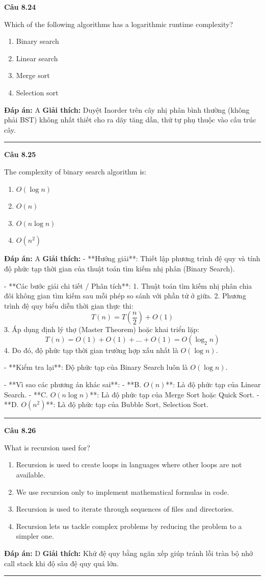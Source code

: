 \documentclass[11pt,a4paper]{article}
\newenvironment{question}[1]{%
  \par\vspace{1em}\noindent\textbf{\large Câu #1}\par\vspace{0.4em}
}{%
  \par\vspace{1em}\hrule\vspace{0.6em}
}
\newenvironment{choices}{%
  \begin{enumerate}[label=\textbf{\Alph*.},leftmargin=2.2em,itemsep=2pt,topsep=3pt]
}{%
  \end{enumerate}
}
\newcommand{\choice}{\item}
\begin{document}
\begin{question}{8.24}
Which of the following algorithms has a logarithmic runtime complexity?
\begin{choices}
\choice Binary search
\choice Linear search
\choice Merge sort
\choice Selection sort
\end{choices}
\textbf{Đáp án:} A
\textbf{Giải thích:} Duyệt Inorder trên cây nhị phân bình thường (không phải BST) không nhất thiết cho ra dãy tăng dần, thứ tự phụ thuộc vào cấu trúc cây.
\end{question}

\begin{question}{8.25}
The complexity of binary search algorithm is:
\begin{choices}
\choice \(O(\log n)\)
\choice \(O(n)\)
\choice \(O(n \log n)\)
\choice \(O(n^2)\)
\end{choices}
\textbf{Đáp án:} A
\textbf{Giải thích:} - **Hướng giải**:
  Thiết lập phương trình đệ quy và tính độ phức tạp thời gian của thuật toán tìm kiếm nhị phân (Binary Search).

- **Các bước giải chi tiết / Phân tích**:
  1. Thuật toán tìm kiếm nhị phân chia đôi không gian tìm kiếm sau mỗi phép so sánh với phần tử ở giữa.
  2. Phương trình đệ quy biểu diễn thời gian thực thi:
     \[
     T(n) = T\left(\frac{n}{2}\right) + O(1)
     \]
  3. Áp dụng định lý thợ (Master Theorem) hoặc khai triển lặp:
     \[
     T(n) = O(1) + O(1) + \dots + O(1) = O(\log_2 n)
     \]
  4. Do đó, độ phức tạp thời gian trường hợp xấu nhất là \(O(\log n)\).

- **Kiểm tra lại**:
  Độ phức tạp của Binary Search luôn là \(O(\log n)\).

- **Vì sao các phương án khác sai**:
  - **B. \(O(n)\)**: Là độ phức tạp của Linear Search.
  - **C. \(O(n \log n)\)**: Là độ phức tạp của Merge Sort hoặc Quick Sort.
  - **D. \(O(n^2)\)**: Là độ phức tạp của Bubble Sort, Selection Sort.
\end{question}

\begin{question}{8.26}
What is recursion used for?
\begin{choices}
\choice Recursion is used to create loops in languages where other loops are not available.
\choice We use recursion only to implement mathematical formulas in code.
\choice Recursion is used to iterate through sequences of files and directories.
\choice Recursion lets us tackle complex problems by reducing the problem to a simpler one.
\end{choices}
\textbf{Đáp án:} D
\textbf{Giải thích:} Khử đệ quy bằng ngăn xếp giúp tránh lỗi tràn bộ nhớ call stack khi độ sâu đệ quy quá lớn.
\end{question}
\end{document}
